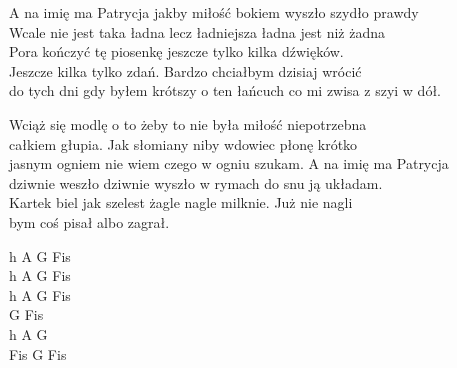 \begin{textn}
    A na imię ma Patrycja jakby miłość bokiem wyszło szydło prawdy\\
    Wcale nie jest taka ładna lecz ładniejsza ładna jest niż żadna\\
    Pora kończyć tę piosenkę jeszcze tylko kilka dźwięków.\\
    Jeszcze kilka tylko zdań. Bardzo chciałbym dzisiaj wrócić\\
    do tych dni gdy byłem krótszy o ten łańcuch co mi zwisa z szyi w dół.

    Wciąż się modlę o to żeby to nie była miłość niepotrzebna\\
    całkiem głupia. Jak słomiany niby wdowiec płonę krótko\\
    jasnym ogniem nie wiem czego w ogniu szukam. A na imię ma Patrycja\\
    dziwnie weszło dziwnie wyszło w rymach do snu ją układam.\\
    Kartek biel jak szelest żagle nagle milknie. Już nie nagli\\
    bym coś pisał albo zagrał.
    
\end{textn}
\begin{chord}
\footnotesize{
    h A G Fis\\
    h A G Fis\\
    h A G Fis\\
    G Fis\\
    h A G\\
    Fis G Fis
}
\end{chord}